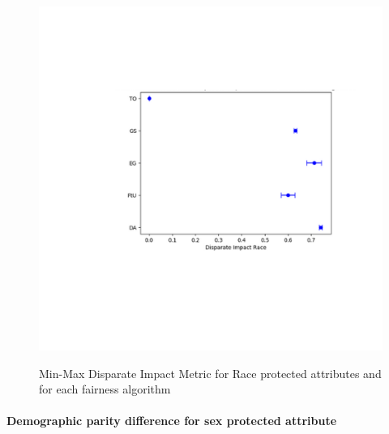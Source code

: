 \begin{figure}[H]
    \centering
    \includegraphics[width=1.0\textwidth, height=1.0\textwidth]{dir.png}
    \label{fig:dir}
    \caption{Min-Max Disparate Impact Metric for Race protected attributes and for each fairness algorithm}
\end{figure}

\paragraph{Demographic parity difference for sex protected attribute}

